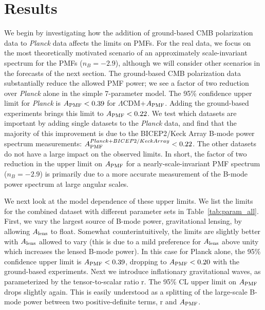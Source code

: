 \documentclass[apj]{emulateapj}
\newcommand{\apmf}{\ensuremath{A_{\rm PMF}}}
\newcommand{\alens}{\ensuremath{A_{\rm lens}}}
\newcommand{\lcdm}{\ensuremath{\Lambda}CDM}
\newcommand{\planck}{{\sl Planck}}
\newcommand{\bicepkeck}{BICEP2/Keck Array}
\newcommand{\sptpol}{SPTpol}
\begin{document}
\section{Results}
\label{sec:results}

We begin by investigating how the addition of ground-based CMB polarization data to \planck{} data affects the limits on PMFs. 
For the real data, we focus on the most theoretically motivated scenario of an approximately scale-invariant spectrum for the PMFs ($n_B=-2.9$), although we will consider other scenarios in the forecasts of the next section. 
The ground-based CMB polarization data  substantially reduce the allowed PMF power; we see a factor of two reduction over \planck{} alone in the simple 7-parameter model. 
The 95\% confidence upper limit for \planck{} is $\apmf <  \upperAplk$ for \lcdm{}+\apmf{}. 
Adding the ground-based experiments brings this limit to $\apmf <  \upperAall$. 
We test which datasets are important by adding single datasets to the \planck{} data, and find that the majority of this improvement is due to the \bicepkeck{}  
B-mode power spectrum measurements: $\apmf^{\planck+\bicepkeck} <  \upperAbicep$. 
The other datasets do not have a large impact on the observed limits. 
In short, the factor of two reduction in the upper limit on \apmf{} for a nearly-scale-invariant PMF spectrum ($n_B=-2.9$) is primarily due to a more accurate measurement of the B-mode power spectrum at large angular scales. 

We next look at the model dependence of these upper limits. 
We list the limits for the combined dataset  with different parameter sets in Table~\ref{tab:param_all}. 
First, we vary the largest source of  B-mode power, gravitational lensing, by allowing \alens{} to float. 
Somewhat counterintuitively, the limits are slightly better with \alens{} allowed to vary (this is due to a mild preference for \alens{} above unity which increases the lensed B-mode power). 
In this case for  Planck alone, the 95\% confidence upper limit is $\apmf <  \upperAplkalens$, dropping to $\apmf <  \upperAallalens$ with the ground-based experiments. 
Next we introduce inflationary gravitational waves, as parameterized by the tensor-to-scalar ratio r. 
The 95\% CL upper limit on \apmf{} drops slightly again.  
This is easily understood as a splitting of the large-scale B-mode power between two positive-definite terms, r and \apmf{}. 
\end{document}

